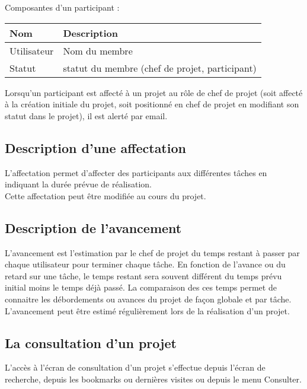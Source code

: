 Composantes d'un participant :\\

\begin{tabular}{|p{3cm}|p{10cm}|}
\hline
\textbf{Nom} & \textbf{Description} \\
\hline
Utilisateur & Nom du membre \\
\hline
Statut & statut du membre (chef de projet, participant) \\
\hline
\end{tabular}
\vspace{0.3cm}

Lorsqu'un participant est affecté à un projet au rôle de chef de projet (soit affecté à la création initiale du projet, soit positionné en chef de projet en modifiant son statut dans le projet), il est alerté par email.

\subsection{Description d'une affectation}

L'affectation permet d'affecter des participants aux différentes tâches en indiquant la durée prévue de réalisation.\\

Cette affectation peut être modifiée au cours du projet.


\subsection{Description de l'avancement}

L'avancement est l'estimation par le chef de projet du temps restant à passer par chaque utilisateur pour terminer chaque tâche. En fonction de l'avance ou du retard sur une tâche, le temps restant sera souvent différent du temps prévu initial moins le temps déjà passé.
La comparaison des ces temps permet de connaitre les débordements ou avances du projet de façon globale et par tâche.\\

L'avancement peut être estimé régulièrement lors de la réalisation d'un projet.


\subsection{La consultation d'un projet}
\label{u_project_consult}

L'accès à l'écran de consultation d'un projet s'effectue depuis l'écran de recherche, depuis les bookmarks ou dernières visites ou depuis le menu Consulter.

